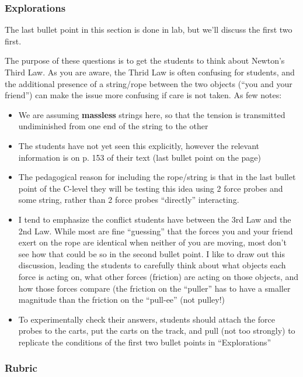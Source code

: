 \documentclass[fleqn,letterpaper]{article}
\begin{document}
\subsubsection*{Explorations}

The last bullet point in this section is done in lab, but we'll discuss the first two first.

The purpose of these questions is to get the students to think about Newton's Third Law.  As you are aware, the Thrid Law is often confusing for students, and the additional presence of a string/rope between the two objects (``you and your friend'') can make the issue more confusing if care is not taken.  As few notes:

\begin{itemize}
 \item{We are assuming \textbf{massless} strings here, so that the tension is transmitted undiminished from one end of the string to the other}
 \item{The students have not yet seen this explicitly, however the relevant information is on p. 153 of their text (last bullet point on the page)}
 \item{The pedagogical reason for including the rope/string is that in the last bullet point of the C-level they will be testing this idea using 2 force probes and some string, rather than 2 force probes ``directly'' interacting.}
 \item{I tend to emphasize the conflict students have between the 3rd Law and the 2nd Law.  While most are fine ``guessing'' that the forces you and your friend exert on the rope are identical when neither of you are moving, most don't see how that could be so in the second bullet point.  I like to draw out this discussion, leading the students to carefully think about what objects each force is acting on, what other forces (friction) are acting on those objects, and how those forces compare (the friction on the ``puller'' has to have a smaller magnitude than the friction on the ``pull-ee'' (not pulley!)}
 \item{To experimentally check their answers, students should attach the force probes to the carts, put the carts on the track, and pull (not too strongly) to replicate the conditions of the first two bullet points in ``Explorations''}
\end{itemize}


\subsubsection*{Rubric}
\end{document}

